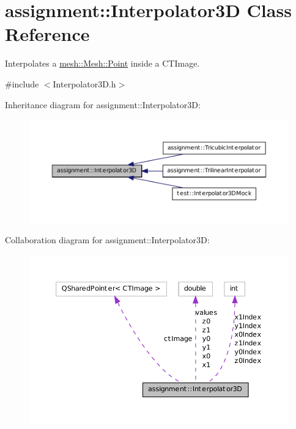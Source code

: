 \hypertarget{classassignment_1_1_interpolator3_d}{
\section{assignment::Interpolator3D Class Reference}
\label{classassignment_1_1_interpolator3_d}
}


Interpolates a \hyperlink{structmesh_1_1_mesh_1_1_point}{mesh::Mesh::Point} inside a CTImage.  




{\ttfamily \#include $<$Interpolator3D.h$>$}



Inheritance diagram for assignment::Interpolator3D:\nopagebreak
\begin{figure}[H]
\begin{center}
\leavevmode
\includegraphics[width=400pt]{classassignment_1_1_interpolator3_d__inherit__graph}
\end{center}
\end{figure}


Collaboration diagram for assignment::Interpolator3D:\nopagebreak
\begin{figure}[H]
\begin{center}
\leavevmode
\includegraphics[width=385pt]{classassignment_1_1_interpolator3_d__coll__graph}
\end{center}
\end{figure}

